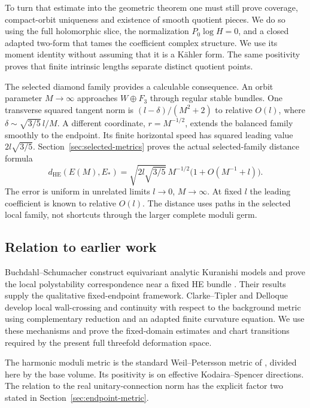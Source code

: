 \documentclass[11pt]{amsart}
\theoremstyle{definition}
\theoremstyle{remark}
\begin{document}
To turn that estimate into the geometric theorem one must still prove
coverage, compact-orbit uniqueness and existence of smooth quotient
pieces. We do so using the full holomorphic slice, the normalization
$P_0\log H=0$, and a closed adapted two-form that tames the coefficient
complex structure. We use its moment identity without assuming that
it is a Kähler form. The same positivity proves that finite intrinsic
lengths separate distinct quotient points.

The selected diamond family provides a calculable consequence.
An orbit parameter $M\to\infty$ approaches $W\oplus F_3$ through
regular stable bundles. One transverse squared tangent norm is
$(l-\delta)/(M^2+2)$ to relative $O(l)$, where
$\delta\sim\sqrt{3/5}\,l/M$. A different coordinate,
$r=M^{-1/2}$, extends the balanced family smoothly to the endpoint.
Its finite horizontal speed has squared leading value $2l\sqrt{3/5}$.
Section~\ref{sec:selected-metrics} proves the actual selected-family
distance formula
\begin{equation}\label{eq:intro-distance}
 d_{\mathrm{HE}}(E(M),E_*)=
 \sqrt{2l\sqrt{3/5}}\,M^{-1/2}\bigl(1+O(M^{-1}+l)\bigr).
\end{equation}
The error is uniform in unrelated limits $l\to0$, $M\to\infty$.
At fixed $l$ the leading coefficient is known to relative $O(l)$.
The distance uses paths in the selected local family, not shortcuts
through the larger complete moduli germ.

\subsection{Relation to earlier work}
Buchdahl--Schumacher construct equivariant analytic Kuranishi models
and prove the local polystability correspondence near a fixed HE
bundle \cite{BuchdahlSchumacher20}. Their results supply the qualitative
fixed-endpoint framework. Clarke--Tipler \cite{ClarkeTipler24} and
Delloque \cite{Delloque25} develop local wall-crossing and continuity
with respect to the background metric using complementary reduction
and an adapted finite curvature equation. We use these mechanisms
and prove the fixed-domain estimates and chart transitions required
by the present full threefold deformation space.

The harmonic moduli metric is the standard Weil--Petersson metric of
\cite[Section~4.1]{BiswasSchumacher16}, divided here by the base volume.
Its positivity is on effective Kodaira--Spencer directions. The relation
to the real unitary-connection norm has the explicit factor two stated
in Section~\ref{sec:endpoint-metric}.
\end{document}

